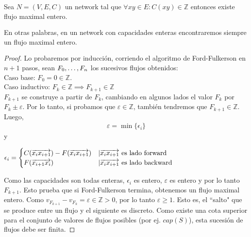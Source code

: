 \begin{theorem}\label{integrality}
  Sea $N=(V,E,C)$ un network tal que $\forall xy \in E : C(xy) \in \mathbb{Z}$ entonces existe flujo maximal entero.
  
  En otras palabras, en un network con capacidades enteras encontraremos siempre un flujo maximal entero.
\end{theorem}

\begin{proof}
  Lo probaremos por inducción, corriendo el algoritmo de Ford-Fulkerson en $n+1$ pasos, sean $F_0, \mathellipsis, F_n$ los sucesivos flujos obtenidos:\\
  Caso base: $F_0 = 0 \in \mathbb{Z}$.\\
  Caso inductivo:
  $F_k \in \mathbb{Z} \implies F_{k+1} \in \mathbb{Z}$\\
  $F_{k+1}$ se construye a partir de $F_k$, cambiando en algunos lados el valor $F_k$ por $F_k \pm \varepsilon$. Por lo tanto, si probamos que $\varepsilon \in \mathbb{Z}$, también tendremos que $F_{k+1} \in \mathbb{Z}$. Luego,
  \begin{align}
    \varepsilon = \min\{\epsilon_i\}
  \end{align}
  y \begin{center}
    $\epsilon_i = \begin{cases} 
        C(\overrightarrow{x_i x_{i+1}}) - F(\overrightarrow{x_i x_{i+1}}) & | \overrightarrow{x_i x_{i+1}} \text{ es lado forward}\\
        F(\overrightarrow{x_{i+1} x_i}) & | \overrightarrow{x_i x_{i+1}} \text{ es lado backward}
    \end{cases}$
  \end{center}
  Como las capacidades son todas enteras, $\epsilon_i$ es entero, $\varepsilon$  es entero y por lo tanto $F_{k+1}$.
  Esto prueba que si Ford-Fulkerson termina, obtenemos un flujo maximal entero.
  Como $v_{F_{k+1}} - v_{F_k} = \varepsilon \in \mathbb{Z} > 0$, por lo tanto $\varepsilon \ge 1$. Esto es, el ``salto" que se produce entre un flujo y el siguiente es discreto.
  Como existe una cota superior para el conjunto de valores de flujos posibles (por ej. $cap(S)$), esta sucesión de flujos debe ser finita. 
\end{proof}

